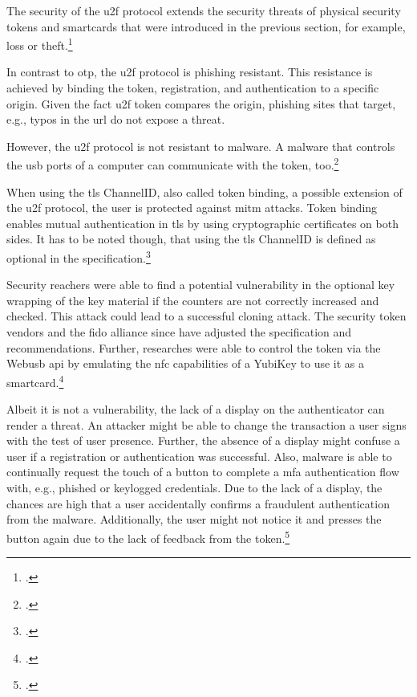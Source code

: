 The security of the \gls{u2f} protocol extends the security threats of physical security tokens and smartcards that were introduced in the previous section, for example, loss or theft.\footcites[See][12--13]{fido-sec-ref}

In contrast to \gls{otp}, the \gls{u2f} protocol is phishing resistant. This resistance is achieved by binding the token, registration, and authentication to a specific origin. Given the fact \gls{u2f} token compares the origin, phishing sites that target, e.g., typos in the \gls{url} do not expose a threat.

However, the \gls{u2f} protocol is not resistant to malware. A malware that controls the \gls{usb} ports of a computer can communicate with the token, too.\footcites[See][10--1]{8429292}[See][9]{u2f-overview}

When using the \gls{tls} ChannelID, also called token binding, a possible extension of the \gls{u2f} protocol, the user is protected against \gls{mitm} attacks. Token binding enables mutual authentication in \gls{tls} by using cryptographic certificates on both sides. It has to be noted though, that using the \gls{tls} ChannelID is defined as optional in the specification.\footcites[See][6--7]{u2f-overview}

Security reachers were able to find a potential vulnerability in the optional key wrapping of the key material if the counters are not correctly increased and checked. This attack could lead to a successful cloning attack. The security token vendors and the \gls{fido} alliance since have adjusted the specification and recommendations. Further, researches were able to control the token via the Web\gls{usb} \gls{api} by emulating the \gls{nfc} capabilities of a YubiKey to use it as a smartcard.\footcites[See][3]{DBLP:journals/corr/abs-1906-06009}

Albeit it is not a vulnerability, the lack of a display on the authenticator can render a threat. An attacker might be able to change the transaction a user signs with the test of user presence. Further, the absence of a display might confuse a user if a registration or authentication was successful. Also, malware is able to continually request the touch of a button to complete a \gls{mfa} authentication flow with, e.g., phished or keylogged credentials. Due to the lack of a display, the chances are high that a user accidentally confirms a fraudulent authentication from the malware. Additionally, the user might not notice it and presses the button again due to the lack of feedback from the token.\footcites[See][434]{10.1007/978-3-662-54970-4_25}[See][15]{das2018johnny}[See][1518--1519]{238325}[See][884]{8418643}


